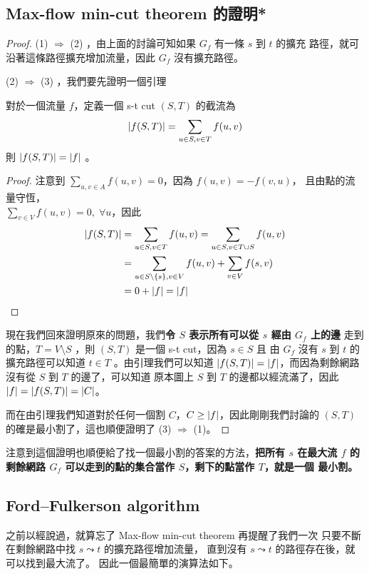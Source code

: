 \documentclass[a4paper,12pt]{book}
\begin{document}
\subsection{Max-flow min-cut theorem 的證明*}
\begin{proof}
  (1) $\Rightarrow$ (2) ，由上面的討論可知如果 $G_f$ 有一條 $s$ 到 $t$ 的擴充
  路徑，就可沿著這條路徑擴充增加流量，因此 $G_f$ 沒有擴充路徑。 
  
  (2) $\Rightarrow$ (3) ，我們要先證明一個引理
\begin{lemma}
  對於一個流量 $f$，定義一個 s-t cut $(S, T)$ 的截流為
  \[ \lvert f(S, T) \rvert = \sum_{u \in S, v \in T} f(u, v) \]
  則 $\lvert f(S, T) \rvert = \lvert f \rvert$ 。
\end{lemma}
\begin{proof}
  注意到 $\sum\limits_{u, v \in A} f(u, v) = 0$，因為 $f(u, v) = -f(v, u)$，
  且由點的流量守恆，\\$\sum\limits_{v \in V} f(u, v) = 0, \; \forall u$，因此
  \vspace*{-.5cm}\begin{align*}
    \lvert f(S, T) \rvert &= \sum_{u \in S, v \in T} f(u, v) 
    = \sum_{u \in S, v \in T \cup S} f(u, v) \\
    &= \sum_{u \in S \setminus \{s\}, v \in V} f(u, v)
     + \sum_{v \in V} f(s, v) \\
     &= 0 + \lvert f \rvert = \lvert f \rvert 
  \end{align*} 
\end{proof}
現在我們回來證明原來的問題，我們{\bf 令 $S$ 表示所有可以從 $s$ 經由 $G_f$ 上的邊}%
走到的點，$T = V \setminus S$ ，則 $(S, T)$ 是一個 s-t cut，因為 $s \in S$ 且
由 $G_f$ 沒有 $s$ 到 $t$ 的擴充路徑可以知道 $t \in T$ 。由引理我們可以知道
$\lvert f(S, T) \rvert = \lvert f \rvert$，而因為剩餘網路沒有從 $S$ 到 $T$ 的邊了，可以知道
原本圖上 $S$ 到 $T$ 的邊都以經流滿了，因此 $\lvert f \rvert = \lvert f(S, T) \rvert = \lvert C \rvert$。

而在由引理我們知道對於任何一個割 $C$，$C \geq \lvert f \rvert$，因此剛剛我們討論的
$(S, T)$的確是最小割了，這也順便證明了 (3) $\Rightarrow$ (1)。
\end{proof}
注意到這個證明也順便給了找一個最小割的答案的方法，{\bf 把所有 $s$ 在最大流 $f$
  的剩餘網路 $G_f$ 可以走到的點的集合當作 $S$，剩下的點當作 $T$，就是一個
  最小割。}

\subsection{Ford–Fulkerson algorithm}
之前以經說過，就算忘了 Max-flow min-cut theorem 再提醒了我們一次
只要不斷在剩餘網路中找 $s \leadsto t$ 的擴充路徑增加流量，
直到沒有 $s \leadsto t$ 的路徑存在後，就可以找到最大流了。
因此一個最簡單的演算法如下。
\end{document}
